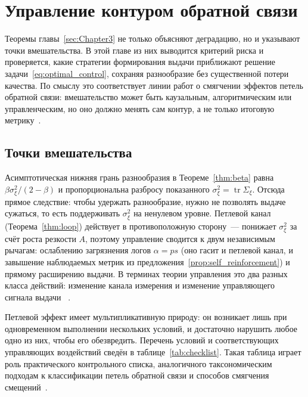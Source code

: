 \section{Управление контуром обратной связи}
\label{sec:Chapter5} 

Теоремы главы~\ref{sec:Chapter3} не только объясняют деградацию, но и указывают
точки вмешательства. В этой главе из них выводится критерий риска и проверяется,
какие стратегии формирования выдачи приближают решение
задачи~\eqref{eq:optimal_control}, сохраняя разнообразие без существенной потери
качества.
По смыслу это соответствует линии работ о смягчении эффектов петель обратной связи: вмешательство
может быть каузальным, алгоритмическим или управленческим, но оно должно менять
сам контур, а не только итоговую метрику~\cite{krauth2022,
stoecker2025biasMitigation, pagan2023feedbackLoops}.

\subsection{Точки вмешательства}
\label{subsec:control_targets}

Асимптотическая нижняя грань разнообразия в Теореме~\ref{thm:beta} равна
$\beta\sigma_\xi^2/(2-\beta)$ и пропорциональна разбросу показанного
$\sigma_\xi^2=\operatorname{tr}\Sigma_\xi$. Отсюда прямое следствие: чтобы
удержать разнообразие, нужно не позволять выдаче сужаться, то есть поддерживать
$\sigma_\xi^2$ на ненулевом уровне. Петлевой канал (Теорема~\ref{thm:loop})
действует в противоположную сторону~--- понижает $\sigma_\xi^2$ за счёт роста
резкости $A$, поэтому управление сводится к двум независимым рычагам:
ослаблению загрязнения логов $\alpha=ps$ (оно гасит и петлевой канал, и
завышение наблюдаемых метрик из предложения~\ref{prop:self_reinforcement}) и
прямому расширению выдачи. В терминах теории управления это два разных класса
действий: изменение канала измерения и изменение управляющего сигнала выдачи
~\cite{depasquale2026controlSystems, chandrasekaran2026networkAware}.

Петлевой эффект имеет мультипликативную природу: он возникает лишь при
одновременном выполнении нескольких условий, и достаточно нарушить любое одно из
них, чтобы его обезвредить. Перечень условий и соответствующих управляющих
воздействий сведён в таблице~\ref{tab:checklist}. Такая таблица играет роль
практического контрольного списка, аналогичного таксономическим подходам к классификации
петель обратной связи и способов смягчения смещений~\cite{pagan2023feedbackLoops,
stoecker2025biasMitigation}.

